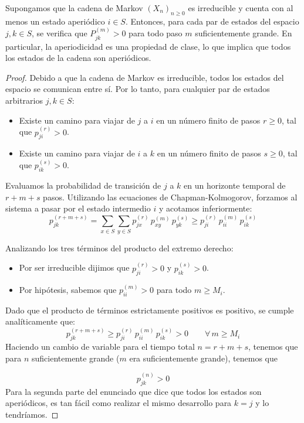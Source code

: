 \begin{lema}
    Supongamos que la cadena de Markov $(X_n)_{n \geq 0}$ es irreducible y cuenta con al menos un estado aperiódico $i \in S$. Entonces, para cada par de estados del espacio $j, k \in S$, se verifica que $P_{jk}^{(m)} > 0$ para todo paso $m$ suficientemente grande. En particular, la aperiodicidad es una propiedad de clase, lo que implica que todos los estados de la cadena son aperiódicos.
\begin{proof}
    Debido a que la cadena de Markov es irreducible, todos los estados del espacio se comunican entre sí. Por lo tanto, para cualquier par de estados arbitrarios $j, k \in S$:
    \begin{itemize}
        \item Existe un camino para viajar de $j$ a $i$ en un número finito de pasos $r \ge 0$, tal que $p_{ji}^{(r)} > 0$.
        \item Existe un camino para viajar de $i$ a $k$ en un número finito de pasos $s \ge 0$, tal que $p_{ik}^{(s)} > 0$.
    \end{itemize}
    Evaluamos la probabilidad de transición de $j$ a $k$ en un horizonte temporal de $r + m + s$ pasos. Utilizando las ecuaciones de Chapman-Kolmogorov, forzamos al sistema a pasar por el estado intermedio $i$ y acotamos inferiormente:
    \[
    p_{jk}^{(r+m+s)} = \sum_{x \in S} \sum_{y \in S} p_{jx}^{(r)} \, p_{xy}^{(m)} \, p_{yk}^{(s)} \ge p_{ji}^{(r)} \, p_{ii}^{(m)} \, p_{ik}^{(s)}
    \]

    Analizando los tres términos del producto del extremo derecho:
    \begin{itemize}
        \item Por ser irreducible dijimos que $p_{ji}^{(r)} > 0$ y $p_{ik}^{(s)} > 0$.
        \item Por hipótesis, sabemos que $p_{ii}^{(m)} > 0$ para todo $m \ge M_i$.
    \end{itemize}
    Dado que el producto de términos estrictamente positivos es positivo, se cumple analíticamente que:
    \[
    p_{jk}^{(r+m+s)} \ge p_{ji}^{(r)} \, p_{ii}^{(m)} \, p_{ik}^{(s)} > 0 \qquad \forall \, m \ge M_i
    \]
    Haciendo un cambio de variable para el tiempo total $n = r + m + s$, tenemos que para $n$ suficientemente grande ($m$ era suficientemente grande), tenemos que

    \begin{equation*}
        p_{jk}^{(n)} > 0 
    \end{equation*}
    Para la segunda parte del enunciado que dice que todos los estados son aperiódicos, es tan fácil como realizar el mismo desarrollo para $k=j$ y lo tendríamos.
\end{proof}
\end{lema}



